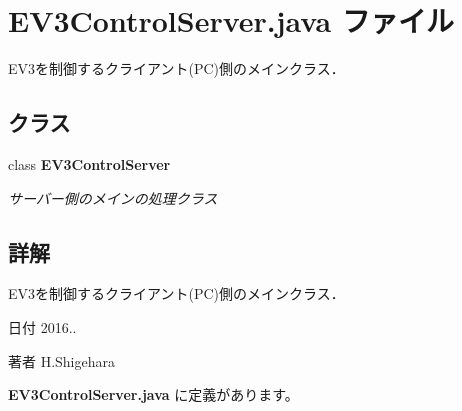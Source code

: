 \section{E\-V3\-Control\-Server.\-java ファイル}
\label{_e_v3_control_server_8java}


E\-V3を制御するクライアント(\-P\-C)側のメインクラス．  


\subsection*{クラス}
\begin{DoxyCompactItemize}
\item 
class {\bf E\-V3\-Control\-Server}
\begin{DoxyCompactList}\small\item\em サーバー側のメインの処理クラス \end{DoxyCompactList}\end{DoxyCompactItemize}


\subsection{詳解}
E\-V3を制御するクライアント(\-P\-C)側のメインクラス． \begin{DoxyDate}{日付}
2016.. 
\end{DoxyDate}
\begin{DoxyAuthor}{著者}
H.\-Shigehara 
\end{DoxyAuthor}


 {\bf E\-V3\-Control\-Server.\-java} に定義があります。

